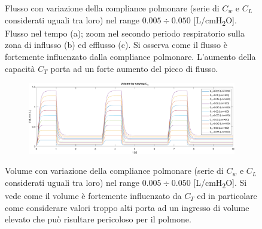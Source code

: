 \begin{figure}[t!]
\begin{subfigure}{0.5\linewidth}
		\caption{}
	\end{subfigure}\hfill
	\caption{Flusso con variazione della compliance polmonare (serie di $C_w$ e $C_L$ considerati uguali tra loro) nel range $0.005\div 0.050$ [L/cmH\textsubscript{2}O]. Flusso nel tempo (a); zoom nel secondo periodo respiratorio sulla zona di influsso (b) ed efflusso (c). Si osserva come il flusso è fortemente influenzato dalla compliance polmonare. L'aumento della capacità $C_T$ porta ad un forte aumento del picco di flusso.}
	\vspace{0.8 cm}
	\begin{subfigure}{\linewidth}
		\centering
		\includegraphics[width=0.95\linewidth]{../model/data_log/CwCL_volume_total.pdf}
	\end{subfigure}\hfill
	\caption{Volume con variazione della compliance polmonare (serie di $C_w$ e $C_L$ considerati uguali tra loro) nel range $0.005\div 0.050$ [L/cmH\textsubscript{2}O]. Si vede come il volume è fortemente influenzato da $C_T$ ed in particolare come considerare valori troppo alti porta ad un ingresso di volume elevato che può risultare pericoloso per il polmone.}
\end{figure}


